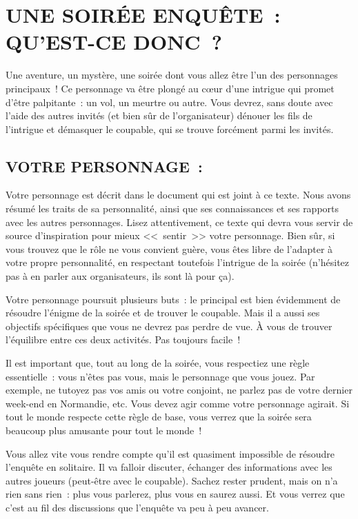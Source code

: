 \documentclass[14pt,twocolumn]{extarticle}
\begin{document}
\section{UNE SOIRÉE ENQUÊTE~: QU'EST-CE DONC~?}

Une aventure, un mystère, une soirée dont vous allez être l'un des personnages
principaux~! Ce personnage va être plongé au c\oe{}ur d'une intrigue qui promet
d'être palpitante~: un vol, un meurtre ou autre. Vous devrez, sans doute avec
l'aide des autres invités (et bien sûr de l'organisateur) dénouer les fils de
l'intrigue et démasquer le coupable, qui se trouve forcément parmi les invités.

\subsection{VOTRE PERSONNAGE~:}

Votre personnage est décrit dans le document qui est joint à ce texte. Nous
avons résumé les traits de sa personnalité, ainsi que ses connaissances et ses
rapports avec les autres personnages. Lisez attentivement, ce texte qui devra
vous servir de source d'inspiration pour mieux <<~sentir~>> votre personnage.
Bien sûr, si vous trouvez que le rôle ne vous convient guère, vous êtes libre
de l'adapter à votre propre personnalité, en respectant toutefois l'intrigue
de la soirée (n'hésitez pas à en parler aux organisateurs, ils sont là pour
ça).

Votre personnage poursuit plusieurs buts~: le principal est bien évidemment de
résoudre l'énigme de la soirée et de trouver le coupable. Mais il a aussi ses
objectifs spécifiques que vous ne devrez pas perdre de vue. À vous de trouver
l'équilibre entre ces deux activités. Pas toujours facile~!

Il est important que, tout au long de la soirée, vous respectiez une règle
essentielle~: vous n'êtes pas vous, mais le personnage que vous jouez. Par
exemple, ne tutoyez pas vos amis ou votre conjoint, ne parlez pas de votre
dernier week-end en Normandie, etc. Vous devez agir comme votre personnage
agirait. Si tout le monde respecte cette règle de base, vous verrez que la
soirée sera beaucoup plus amusante pour tout le monde~!

Vous allez vite vous rendre compte qu'il est quasiment impossible de résoudre
l'enquête en solitaire. Il va falloir discuter, échanger des informations avec
les autres joueurs (peut-être avec le coupable). Sachez rester prudent, mais on
n'a rien sans rien~: plus vous parlerez, plus vous en saurez aussi. Et vous
verrez que c'est au fil des discussions que l'enquête va peu à peu avancer.
\end{document}
